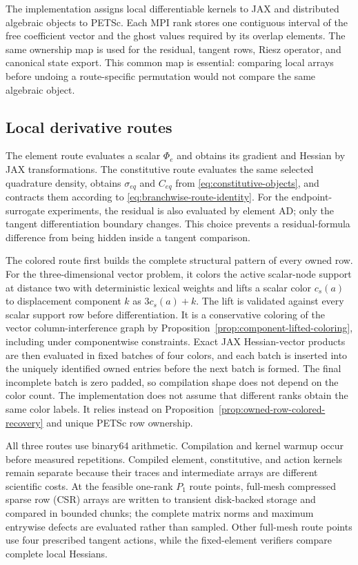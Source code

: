 \label{sec:implementation}

The implementation assigns local differentiable kernels to JAX and distributed
algebraic objects to PETSc. Each MPI rank stores one contiguous interval of the
free coefficient vector and the ghost values required by its overlap elements.
The same ownership map is used for the residual, tangent rows, Riesz operator,
and canonical state export. This common map is essential: comparing local
arrays before undoing a route-specific permutation would not compare the same
algebraic object.

\subsection{Local derivative routes}
\label{subsec:implementation-routes}

The element route evaluates a scalar $\Phi_e$ and obtains its gradient and
Hessian by JAX transformations. The constitutive route evaluates the same
selected quadrature density, obtains $\sigma_{eq}$ and $C_{eq}$ from
\eqref{eq:constitutive-objects}, and contracts them according to
\eqref{eq:branchwise-route-identity}. For the endpoint-surrogate experiments, the
residual is also evaluated by element AD; only the tangent differentiation
boundary changes. This choice prevents a residual-formula difference from
being hidden inside a tangent comparison.

The colored route first builds the complete structural pattern of every owned
row. For the three-dimensional vector problem, it colors the active scalar-node
support at distance two with deterministic lexical weights and lifts a scalar
color $c_s(a)$ to displacement component $k$ as $3c_s(a)+k$. The lift is
validated against every scalar support row before differentiation. It is a
conservative coloring of the vector column-interference graph by
Proposition~\ref{prop:component-lifted-coloring}, including under componentwise
constraints. Exact JAX Hessian-vector products are then evaluated in fixed
batches of four colors, and each batch is inserted into the uniquely identified
owned entries before the next batch is formed. The final incomplete batch is
zero padded, so compilation shape does not depend on the color count. The
implementation does not assume that different ranks obtain the same color
labels. It relies instead on Proposition~\ref{prop:owned-row-colored-recovery}
and unique PETSc row ownership.

All three routes use binary64 arithmetic. Compilation and kernel warmup occur
before measured repetitions. Compiled element, constitutive, and action kernels
remain separate because their traces and intermediate arrays are different
scientific costs. At the feasible one-rank $P_1$ route points, full-mesh
compressed sparse row (CSR) arrays are written to transient disk-backed storage
and compared in bounded chunks; the complete matrix norms and maximum entrywise
defects are evaluated rather than sampled. Other full-mesh route points use four
prescribed tangent actions, while the fixed-element verifiers compare complete
local Hessians.

